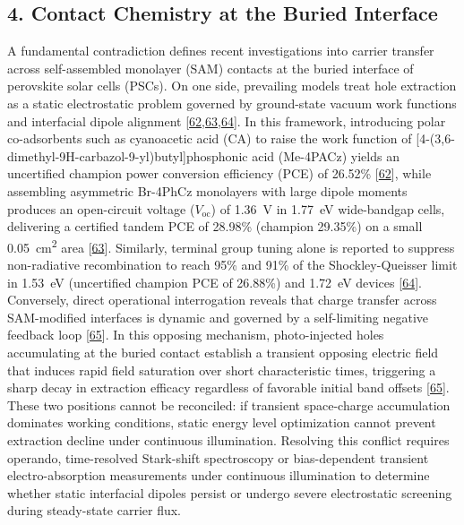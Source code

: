 \documentclass[
  11pt,
]{article}
\begin{document}
\subsection{4. Contact Chemistry at the Buried
Interface}\label{contact-chemistry-at-the-buried-interface}

A fundamental contradiction defines recent investigations into carrier
transfer across self-assembled monolayer (SAM) contacts at the buried
interface of perovskite solar cells (PSCs). On one side, prevailing
models treat hole extraction as a static electrostatic problem governed
by ground-state vacuum work functions and interfacial dipole alignment
{[}\href{https://doi.org/10.1002/adfm.76291}{62},\href{https://doi.org/10.1002/adma.202523338}{63},\href{https://doi.org/10.1002/anie.8473744}{64}{]}.
In this framework, introducing polar co-adsorbents such as cyanoacetic
acid (CA) to raise the work function of
{[}4-(3,6-dimethyl-9H-carbazol-9-yl)butyl{]}phosphonic acid (Me-4PACz)
yields an uncertified champion power conversion efficiency (PCE) of
26.52\% {[}\href{https://doi.org/10.1002/adfm.76291}{62}{]}, while
assembling asymmetric Br-4PhCz monolayers with large dipole moments
produces an open-circuit voltage (\(V_\mathrm{oc}\)) of
\qty{1.36}{\volt} in \qty{1.77}{\electronvolt} wide-bandgap cells,
delivering a certified tandem PCE of 28.98\% (champion 29.35\%) on a
small \qty{0.05}{\centi\meter\squared} area
{[}\href{https://doi.org/10.1002/adma.202523338}{63}{]}. Similarly,
terminal group tuning alone is reported to suppress non-radiative
recombination to reach 95\% and 91\% of the Shockley-Queisser limit in
\qty{1.53}{\electronvolt} (uncertified champion PCE of 26.88\%) and
\qty{1.72}{\electronvolt} devices
{[}\href{https://doi.org/10.1002/anie.8473744}{64}{]}. Conversely,
direct operational interrogation reveals that charge transfer across
SAM-modified interfaces is dynamic and governed by a self-limiting
negative feedback loop
{[}\href{https://doi.org/10.1002/adfm.75295}{65}{]}. In this opposing
mechanism, photo-injected holes accumulating at the buried contact
establish a transient opposing electric field that induces rapid field
saturation over short characteristic times, triggering a sharp decay in
extraction efficacy regardless of favorable initial band offsets
{[}\href{https://doi.org/10.1002/adfm.75295}{65}{]}. These two positions
cannot be reconciled: if transient space-charge accumulation dominates
working conditions, static energy level optimization cannot prevent
extraction decline under continuous illumination. Resolving this
conflict requires operando, time-resolved Stark-shift spectroscopy or
bias-dependent transient electro-absorption measurements under
continuous illumination to determine whether static interfacial dipoles
persist or undergo severe electrostatic screening during steady-state
carrier flux.
\end{document}
